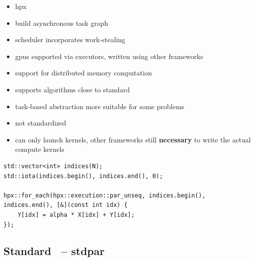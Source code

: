 \begin{itemize}
    \item \acrfull{hpx}
    \item build asynchronous task graph
    \item scheduler incorporates work-stealing
    \item \glspl{gpu} supported via executors, written using other frameworks
    \item support for distributed memory computation
\end{itemize}


\begin{advantagebox}
    \begin{itemize}
        \item supports algorithms close to \cpp standard
        \item task-based abstraction more suitable for some problems
    \end{itemize}
\end{advantagebox}

\begin{disadvantagebox}
    \begin{itemize}
        \item not standardized
        \item can only launch kernels, other frameworks still \textbf{necessary} to write the actual compute kernels 
    \end{itemize}
\end{disadvantagebox}

\begin{listing}
    \begin{verbatim}
std::vector<int> indices(N);
std::iota(indices.begin(), indices.end(), 0);

hpx::for_each(hpx::execution::par_unseq, indices.begin(), indices.end(), [&](const int idx) {
    Y[idx] = alpha * X[idx] + Y[idx];
});
    \end{verbatim}
    \caption{%
    A simple DAXPY example using \gls{hpx} parallel loops.
    }
    \label{code:hpx_example}
\end{listing}





\newpage

\subsection{Standard \cpp\ -- stdpar}
\label{sec:frameworks:stdpar}


